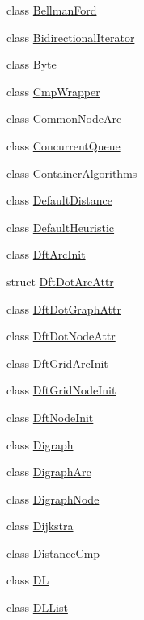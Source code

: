 \begin{DoxyCompactItemize}
\item 
class \hyperlink{class_designar_1_1_bellman_ford}{Bellman\+Ford}
\item 
class \hyperlink{class_designar_1_1_bidirectional_iterator}{Bidirectional\+Iterator}
\item 
class \hyperlink{class_designar_1_1_byte}{Byte}
\item 
class \hyperlink{class_designar_1_1_cmp_wrapper}{Cmp\+Wrapper}
\item 
class \hyperlink{class_designar_1_1_common_node_arc}{Common\+Node\+Arc}
\item 
class \hyperlink{class_designar_1_1_concurrent_queue}{Concurrent\+Queue}
\item 
class \hyperlink{class_designar_1_1_container_algorithms}{Container\+Algorithms}
\item 
class \hyperlink{class_designar_1_1_default_distance}{Default\+Distance}
\item 
class \hyperlink{class_designar_1_1_default_heuristic}{Default\+Heuristic}
\item 
class \hyperlink{class_designar_1_1_dft_arc_init}{Dft\+Arc\+Init}
\item 
struct \hyperlink{struct_designar_1_1_dft_dot_arc_attr}{Dft\+Dot\+Arc\+Attr}
\item 
class \hyperlink{class_designar_1_1_dft_dot_graph_attr}{Dft\+Dot\+Graph\+Attr}
\item 
class \hyperlink{class_designar_1_1_dft_dot_node_attr}{Dft\+Dot\+Node\+Attr}
\item 
class \hyperlink{class_designar_1_1_dft_grid_arc_init}{Dft\+Grid\+Arc\+Init}
\item 
class \hyperlink{class_designar_1_1_dft_grid_node_init}{Dft\+Grid\+Node\+Init}
\item 
class \hyperlink{class_designar_1_1_dft_node_init}{Dft\+Node\+Init}
\item 
class \hyperlink{class_designar_1_1_digraph}{Digraph}
\item 
class \hyperlink{class_designar_1_1_digraph_arc}{Digraph\+Arc}
\item 
class \hyperlink{class_designar_1_1_digraph_node}{Digraph\+Node}
\item 
class \hyperlink{class_designar_1_1_dijkstra}{Dijkstra}
\item 
class \hyperlink{class_designar_1_1_distance_cmp}{Distance\+Cmp}
\item 
class \hyperlink{class_designar_1_1_d_l}{DL}
\item 
class \hyperlink{class_designar_1_1_d_l_list}{D\+L\+List}

\end{DoxyCompactItemize}
